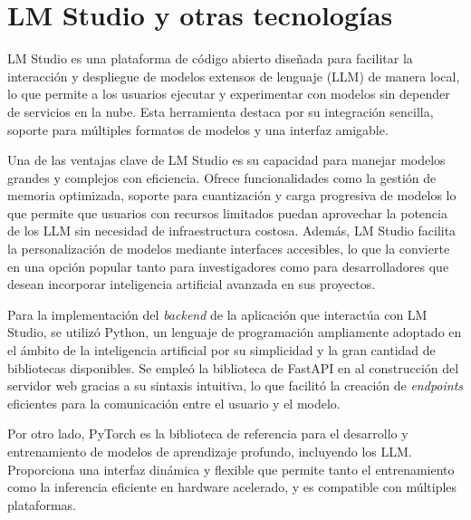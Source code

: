 \section{LM Studio y otras tecnologías}
LM Studio \cite{lmstudio} es una plataforma de código abierto diseñada para facilitar la interacción
y despliegue de modelos extensos de lenguaje (LLM) de manera local,
lo que permite a los usuarios ejecutar y experimentar con modelos sin depender de servicios en la nube.
Esta herramienta destaca por su integración sencilla, soporte para múltiples formatos de modelos y una interfaz amigable.

Una de las ventajas clave de LM Studio es su capacidad para manejar modelos grandes y complejos con eficiencia.
Ofrece funcionalidades como la gestión de memoria optimizada,
soporte para cuantización y carga progresiva de modelos
lo que permite que usuarios con recursos limitados puedan aprovechar la potencia de los LLM
sin necesidad de infraestructura costosa.
Además, LM Studio facilita la personalización de modelos mediante interfaces accesibles,
lo que la convierte en una opción popular tanto para investigadores como para desarrolladores
que desean incorporar inteligencia artificial avanzada en sus proyectos.

Para la implementación del \textit{backend} de la aplicación que interactúa con LM Studio, se utilizó Python,
un lenguaje de programación ampliamente adoptado en el ámbito de la inteligencia artificial por su simplicidad
y la gran cantidad de bibliotecas disponibles.
Se empleó la biblioteca de FastAPI \cite{fastapi} en al construcción del servidor web gracias a su sintaxis intuitiva,
lo que facilitó la creación de \textit{endpoints} eficientes para la comunicación entre el usuario y el modelo.

Por otro lado, PyTorch \cite{pytorch} es la biblioteca de referencia para el desarrollo 
y entrenamiento de modelos de aprendizaje profundo, incluyendo los LLM.
Proporciona una interfaz dinámica y flexible que permite tanto el entrenamiento
como la inferencia eficiente en hardware acelerado, y es compatible con múltiples plataformas.